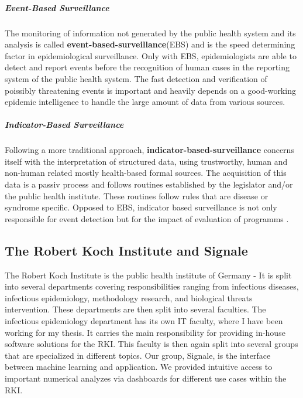 \subparagraph{Event-Based Surveillance}
 The monitoring of information not generated by the public health system and its analysis is called \textbf{event-based-surveillance}(\gls{EBS}) and is the speed determining factor in epidemiological surveillance. Only with EBS, epidemiologists are able to detect and report events before the recognition of human cases in the reporting system of the public health system\cite{EarlyDetection}. The fast detection and verification of poissibly threatening events is important and heavily depends on a good-working epidemic intelligence to handle the large amount of data from various sources.

\subparagraph{Indicator-Based Surveillance}
Following a more traditional approach, \textbf{indicator-based-surveillance} concerns itself with the interpretation of structured data, using trustworthy, human and non-human related mostly health-based formal sources\cite{EarlyDetection}. The acquisition of this data is a passiv process and follows routines established by the legislator and/or the public health institute. These routines follow rules that are disease or syndrome specific. Opposed to EBS, indicator based surveillance is not only responsible for event detection but for the impact of evaluation of programms \cite{EarlyDetection}.


\subsection{The Robert Koch Institute and Signale}
The Robert Koch Institute is the public health institute of Germany - It is
split into several departments covering responsibilities ranging from infectious diseases, infectious epidemiology, methodology research, and biological threats intervention.
These departments are then split into several faculties. The infectious epidemiology department has its own IT faculty,
where I have been working for my thesis. It carries the main responsibility for providing in-house software solutions for the RKI. This faculty is then again split into several groups that are specialized in different topics.
Our group, Signale, is the interface between machine learning and application.
We provided intuitive access to important numerical analyzes via dashboards for different use cases within the RKI.

